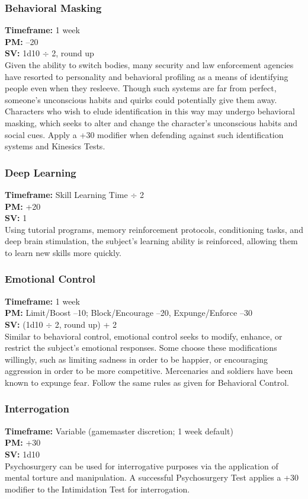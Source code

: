 \subsubsection{Behavioral Masking}
\textbf{Timeframe:} 1 week \\
\textbf{PM:} –20 \\
\textbf{SV:} 1d10 $\div$ 2, round up \\
Given the ability to switch bodies, many security and
law enforcement agencies have resorted to personality
and behavioral profiling as a means of identifying
people even when they resleeve. Though such systems
are far from perfect, someone’s unconscious habits
and quirks could potentially give them away. Characters
who wish to elude identification in this way may
undergo behavioral masking, which seeks to alter and
change the character’s unconscious habits and social
cues. Apply a +30 modifier when defending against
such identification systems and Kinesics Tests.

\subsubsection{Deep Learning}
\textbf{Timeframe:} Skill Learning Time $\div$ 2 \\
\textbf{PM:} +20 \\
\textbf{SV:} 1 \\
Using tutorial programs, memory reinforcement protocols,
conditioning tasks, and deep brain stimulation,
the subject’s learning ability is reinforced, allowing
them to learn new skills more quickly.

\subsubsection{Emotional Control}
\textbf{Timeframe:} 1 week \\
\textbf{PM:} Limit/Boost –10; Block/Encourage –20, Expunge/Enforce –30 \\
\textbf{SV:} (1d10 $\div$ 2, round up) + 2 \\
Similar to behavioral control, emotional control seeks
to modify, enhance, or restrict the subject’s emotional
responses. Some choose these modifications willingly,
such as limiting sadness in order to be happier, or
encouraging aggression in order to be more competitive.
Mercenaries and soldiers have been known
to expunge fear. Follow the same rules as given for
Behavioral Control.


\subsubsection{Interrogation}
\textbf{Timeframe:} Variable (gamemaster discretion; 1 week default) \\
\textbf{PM:} +30 \\
\textbf{SV:} 1d10 \\
Psychosurgery can be used for interrogative purposes
via the application of mental torture and manipulation.
A successful Psychosurgery Test applies a +30
modifier to the Intimidation Test for interrogation.

